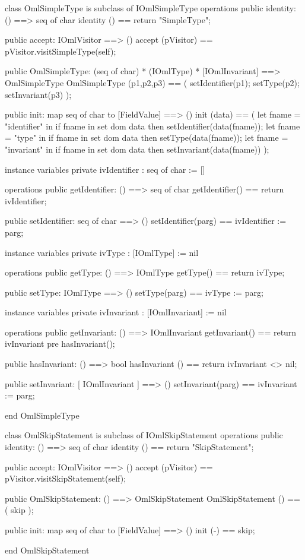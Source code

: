 \begin{vdm_al}
class OmlSimpleType is subclass of IOmlSimpleType
operations
  public identity: () ==> seq of char
  identity () == return "SimpleType";

  public accept: IOmlVisitor ==> ()
  accept (pVisitor) == pVisitor.visitSimpleType(self);

  public OmlSimpleType:
      (seq of char) *
      (IOmlType) *
      [IOmlInvariant] ==> OmlSimpleType
  OmlSimpleType (p1,p2,p3) == 
   ( setIdentifier(p1);
     setType(p2);
     setInvariant(p3) );

  public init: map seq of char to [FieldValue] ==> ()
  init (data) ==
    ( let fname = "identifier" in
        if fname in set dom data
        then setIdentifier(data(fname));
      let fname = "type" in
        if fname in set dom data
        then setType(data(fname));
      let fname = "invariant" in
        if fname in set dom data
        then setInvariant(data(fname)) );

instance variables
  private ivIdentifier : seq of char := []

operations
  public getIdentifier: () ==> seq of char
  getIdentifier() == return ivIdentifier;

  public setIdentifier: seq of char ==> ()
  setIdentifier(parg) == ivIdentifier := parg;

instance variables
  private ivType : [IOmlType] := nil

operations
  public getType: () ==> IOmlType
  getType() == return ivType;

  public setType: IOmlType ==> ()
  setType(parg) == ivType := parg;

instance variables
  private ivInvariant : [IOmlInvariant] := nil

operations
  public getInvariant: () ==> IOmlInvariant
  getInvariant() == return ivInvariant
    pre hasInvariant();

  public hasInvariant: () ==> bool
  hasInvariant () == return ivInvariant <> nil;

  public setInvariant: [ IOmlInvariant ] ==> ()
  setInvariant(parg) == ivInvariant := parg;

end OmlSimpleType
\end{vdm_al}

\begin{vdm_al}
class OmlSkipStatement is subclass of IOmlSkipStatement
operations
  public identity: () ==> seq of char
  identity () == return "SkipStatement";

  public accept: IOmlVisitor ==> ()
  accept (pVisitor) == pVisitor.visitSkipStatement(self);

  public OmlSkipStatement:
      () ==> OmlSkipStatement
  OmlSkipStatement () == 
    ( skip );

  public init: map seq of char to [FieldValue] ==> ()
  init (-) == skip;

end OmlSkipStatement
\end{vdm_al}

